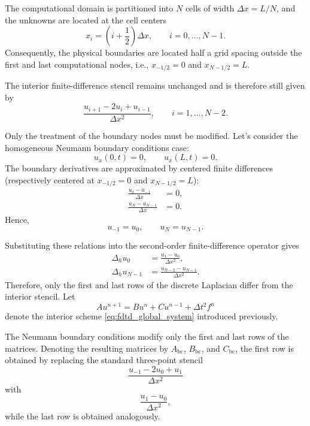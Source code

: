 \documentclass{Configuration_Files/PoliMi3i_thesis}
\begin{document}
The computational domain is partitioned into $N$ cells of width
$\Delta x=L/N$, and the unknowns are located at the cell centers
\begin{equation*}
x_i
=
\left(i+\frac12\right)\Delta x,
\qquad
i=0,\ldots,N-1.
\end{equation*}
Consequently, the physical boundaries are located half a grid spacing outside the first and last computational nodes, i.e., $x_{-1/2}=0$ and $x_{N-1/2}=L$.

The interior finite-difference stencil remains unchanged and is therefore still given by
\begin{equation*}
\frac{
u_{i+1}-2u_i+u_{i-1}
}{\Delta x^2},
\qquad
i=1,\ldots,N-2.
\end{equation*}

Only the treatment of the boundary nodes must be modified. Let's consider the homogeneous Neumann boundary conditions case:
\begin{equation*}
u_x(0,t)=0,
\qquad
u_x(L,t)=0.
\end{equation*}
The boundary derivatives are approximated by centered finite differences (respectively centered at $x_{-1/2}=0$ and $x_{N-1/2} = L$):
\begin{align*}
\frac{u_0-u_{-1}}{\Delta x}
&=0,
\\
\frac{u_N-u_{N-1}}{\Delta x}
&=0.
\end{align*}
Hence,
\begin{equation*}
u_{-1}=u_0,
\qquad
u_N=u_{N-1}.
\end{equation*}

Substituting these relations into the second-order finite-difference operator gives
\begin{align*}
\Delta_hu_0
&=
\frac{u_1-u_0}{\Delta x^2},
\\
\Delta_hu_{N-1}
&=
\frac{u_{N-2}-u_{N-1}}{\Delta x^2}.
\end{align*}
Therefore, only the first and last rows of the discrete Laplacian differ from the interior stencil. Let
\begin{equation*}
A u^{n+1}
=
B u^n
+
C u^{n-1}
+
\Delta t^2f^n
\end{equation*}
denote the interior scheme \eqref{eq:fdtd_global_system} introduced previously.

The Neumann boundary conditions modify only the first and last rows of the matrices. Denoting the resulting matrices by
$A_{\mathrm{bc}}$, $B_{\mathrm{bc}}$, and $C_{\mathrm{bc}}$, the first row is obtained by replacing the standard three-point stencil
\begin{equation*}
\frac{
u_{-1}-2u_0+u_1
}{\Delta x^2}
\end{equation*}
with
\begin{equation*}
\frac{
u_1-u_0
}{\Delta x^2},
\end{equation*}
while the last row is obtained analogously.
\end{document}

